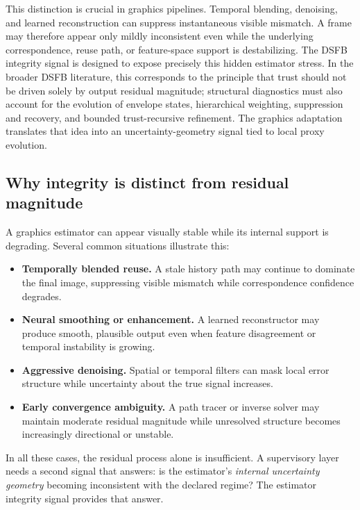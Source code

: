 \documentclass[11pt,letterpaper]{article}
\theoremstyle{gcresult}
\theoremstyle{definition}
\begin{document}
This distinction is crucial in graphics pipelines. Temporal blending, denoising, and learned reconstruction can suppress instantaneous visible mismatch. A frame may therefore appear only mildly inconsistent even while the underlying correspondence, reuse path, or feature-space support is destabilizing. The DSFB integrity signal is designed to expose precisely this hidden estimator stress. In the broader DSFB literature, this corresponds to the principle that trust should not be driven solely by output residual magnitude; structural diagnostics must also account for the evolution of envelope states, hierarchical weighting, suppression and recovery, and bounded trust-recursive refinement. The graphics adaptation translates that idea into an uncertainty-geometry signal tied to local proxy evolution. 


\subsection{Why integrity is distinct from residual magnitude}

A graphics estimator can appear visually stable while its internal support is degrading. Several common situations illustrate this:

\begin{itemize}[leftmargin=1.5em]
    \item \textbf{Temporally blended reuse.} A stale history path may continue to dominate the final image, suppressing visible mismatch while correspondence confidence degrades.
    \item \textbf{Neural smoothing or enhancement.} A learned reconstructor may produce smooth, plausible output even when feature disagreement or temporal instability is growing.
    \item \textbf{Aggressive denoising.} Spatial or temporal filters can mask local error structure while uncertainty about the true signal increases.
    \item \textbf{Early convergence ambiguity.} A path tracer or inverse solver may maintain moderate residual magnitude while unresolved structure becomes increasingly directional or unstable.
\end{itemize}

In all these cases, the residual process alone is insufficient. A supervisory layer needs a second signal that answers: is the estimator’s \emph{internal uncertainty geometry} becoming inconsistent with the declared regime? The estimator integrity signal provides that answer.
\end{document}
